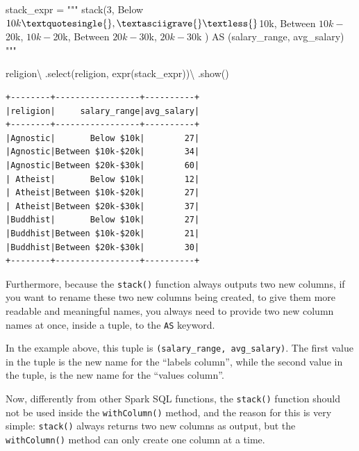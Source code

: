 \documentclass[
  11pt,
  letterpaper,
  DIV=11,
  numbers=noendperiod]{scrreprt}
\newenvironment{Shaded}{\begin{snugshade}}{\end{snugshade}}
\newcommand{\NormalTok}[1]{\textcolor[rgb]{0.00,0.23,0.31}{#1}}
\newcommand{\OperatorTok}[1]{\textcolor[rgb]{0.37,0.37,0.37}{#1}}
\newcommand{\StringTok}[1]{\textcolor[rgb]{0.13,0.47,0.30}{#1}}
\begin{document}
\begin{Shaded}
\begin{Highlighting}[]
\NormalTok{stack\_expr }\OperatorTok{=} \StringTok{"""}
\StringTok{stack(3,}
\StringTok{    \textquotesingle{}Below $10k\textquotesingle{}, \textasciigrave{}\textless{}$10k\textasciigrave{},}
\StringTok{    \textquotesingle{}Between $10k{-}$20k\textquotesingle{}, \textasciigrave{}$10k{-}$20k\textasciigrave{},}
\StringTok{    \textquotesingle{}Between $20k{-}$30k\textquotesingle{}, \textasciigrave{}$20k{-}$30k\textasciigrave{}}
\StringTok{) AS (salary\_range, avg\_salary)}
\StringTok{"""}

\NormalTok{religion}\OperatorTok{\textbackslash{}}
\NormalTok{    .select(}\StringTok{\textquotesingle{}religion\textquotesingle{}}\NormalTok{, expr(stack\_expr))}\OperatorTok{\textbackslash{}}
\NormalTok{    .show()}
\end{Highlighting}
\end{Shaded}

\begin{verbatim}
+--------+-----------------+----------+
|religion|     salary_range|avg_salary|
+--------+-----------------+----------+
|Agnostic|       Below $10k|        27|
|Agnostic|Between $10k-$20k|        34|
|Agnostic|Between $20k-$30k|        60|
| Atheist|       Below $10k|        12|
| Atheist|Between $10k-$20k|        27|
| Atheist|Between $20k-$30k|        37|
|Buddhist|       Below $10k|        27|
|Buddhist|Between $10k-$20k|        21|
|Buddhist|Between $20k-$30k|        30|
+--------+-----------------+----------+
\end{verbatim}

Furthermore, because the \texttt{stack()} function always outputs two
new columns, if you want to rename these two new columns being created,
to give them more readable and meaningful names, you always need to
provide two new column names at once, inside a tuple, to the \texttt{AS}
keyword.

In the example above, this tuple is
\texttt{(salary\_range,\ avg\_salary)}. The first value in the tuple is
the new name for the ``labels column'', while the second value in the
tuple, is the new name for the ``values column''.

Now, differently from other Spark SQL functions, the \texttt{stack()}
function should not be used inside the \texttt{withColumn()} method, and
the reason for this is very simple: \texttt{stack()} always returns two
new columns as output, but the \texttt{withColumn()} method can only
create one column at a time.
\end{document}
